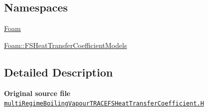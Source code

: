 \subsection*{Namespaces}
\begin{DoxyCompactItemize}
\item 
 \hyperlink{namespaceFoam}{Foam}
\item 
 \hyperlink{namespaceFoam_1_1FSHeatTransferCoefficientModels}{Foam\+::\+F\+S\+Heat\+Transfer\+Coefficient\+Models}
\end{DoxyCompactItemize}


\subsection{Detailed Description}
{\bfseries Original source file} \href{../../../home/carlo/data/GeN-Foam/GeN-Foam_ffn/GeN-Foam/GeN-Foam/classes/thermalHydraulics/src/physicsModels/heatTransferModels/FSHeatTransferCoefficientModels/multiRegimeBoilingVapourTRACE/multiRegimeBoilingVapourTRACEFSHeatTransferCoefficient.H}{\tt multi\+Regime\+Boiling\+Vapour\+T\+R\+A\+C\+E\+F\+S\+Heat\+Transfer\+Coefficient.\+H} 